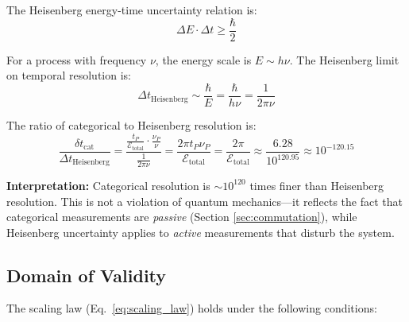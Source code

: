 \documentclass[twocolumn,10pt]{article}
\theoremstyle{remark}
\begin{document}
The Heisenberg energy-time uncertainty relation is:
\begin{equation}
    \Delta E \cdot \Delta t \geq \frac{\hbar}{2}
    \label{eq:heisenberg_uncertainty}
\end{equation}

For a process with frequency $\nu$, the energy scale is $E \sim h\nu$. The Heisenberg limit on temporal resolution is:
\begin{equation}
    \Delta t_{\text{Heisenberg}} \sim \frac{\hbar}{E} = \frac{\hbar}{h\nu} = \frac{1}{2\pi\nu}
    \label{eq:heisenberg_limit}
\end{equation}

The ratio of categorical to Heisenberg resolution is:
\begin{equation}
    \frac{\delta t_{\text{cat}}}{\Delta t_{\text{Heisenberg}}} = \frac{\frac{t_P}{\mathcal{E}_{\text{total}}} \cdot \frac{\nu_P}{\nu}}{\frac{1}{2\pi\nu}} = \frac{2\pi t_P \nu_P}{\mathcal{E}_{\text{total}}} = \frac{2\pi}{\mathcal{E}_{\text{total}}} \approx \frac{6.28}{10^{120.95}} \approx 10^{-120.15}
    \label{eq:categorical_vs_heisenberg}
\end{equation}

\textbf{Interpretation:} Categorical resolution is $\sim 10^{120}$ times finer than Heisenberg resolution. This is not a violation of quantum mechanics—it reflects the fact that categorical measurements are \textit{passive} (Section \ref{sec:commutation}), while Heisenberg uncertainty applies to \textit{active} measurements that disturb the system.

\subsection{Domain of Validity}

The scaling law (Eq.~\ref{eq:scaling_law}) holds under the following conditions:
\end{document}
